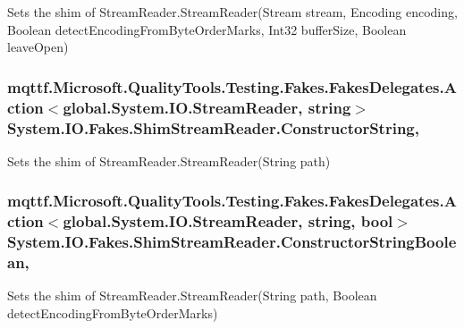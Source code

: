Sets the shim of Stream\-Reader.\-Stream\-Reader(\-Stream stream, Encoding encoding, Boolean detect\-Encoding\-From\-Byte\-Order\-Marks, Int32 buffer\-Size, Boolean leave\-Open)

\hypertarget{class_system_1_1_i_o_1_1_fakes_1_1_shim_stream_reader_a8c57f9a13cf380c232e4f021d4e05642}{
\subsubsection[{Constructor\-String}]{\setlength{\rightskip}{0pt plus 5cm}mqttf.\-Microsoft.\-Quality\-Tools.\-Testing.\-Fakes.\-Fakes\-Delegates.\-Action$<$global.\-System.\-I\-O.\-Stream\-Reader, string$>$ System.\-I\-O.\-Fakes.\-Shim\-Stream\-Reader.\-Constructor\-String\hspace{0.3cm}{\ttfamily [static]}, {\ttfamily [set]}}}\label{class_system_1_1_i_o_1_1_fakes_1_1_shim_stream_reader_a8c57f9a13cf380c232e4f021d4e05642}


Sets the shim of Stream\-Reader.\-Stream\-Reader(\-String path)

\hypertarget{class_system_1_1_i_o_1_1_fakes_1_1_shim_stream_reader_a245fd38f3c291e28cebff251c739f10e}{
\subsubsection[{Constructor\-String\-Boolean}]{\setlength{\rightskip}{0pt plus 5cm}mqttf.\-Microsoft.\-Quality\-Tools.\-Testing.\-Fakes.\-Fakes\-Delegates.\-Action$<$global.\-System.\-I\-O.\-Stream\-Reader, string, bool$>$ System.\-I\-O.\-Fakes.\-Shim\-Stream\-Reader.\-Constructor\-String\-Boolean\hspace{0.3cm}{\ttfamily [static]}, {\ttfamily [set]}}}\label{class_system_1_1_i_o_1_1_fakes_1_1_shim_stream_reader_a245fd38f3c291e28cebff251c739f10e}


Sets the shim of Stream\-Reader.\-Stream\-Reader(\-String path, Boolean detect\-Encoding\-From\-Byte\-Order\-Marks)

